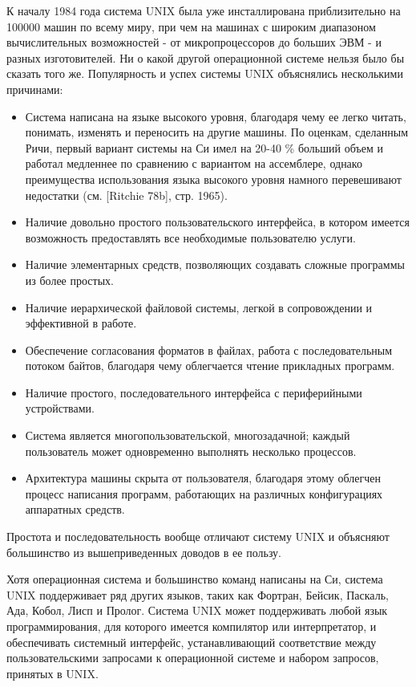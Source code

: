     К началу 1984 года система UNIX была уже  инсталлирована  приблизительно на  100000  машин по всему миру, при чем на машинах с широким диапазоном вычислительных возможностей - от микропроцессоров до больших ЭВМ  -  и  разных изготовителей. Ни о какой другой операционной системе нельзя было бы сказать того  же. Популярность и успех системы UNIX объяснялись несколькими причинами:
\begin{itemize}
\item Система написана на языке высокого уровня, благодаря чему ее легко читать,
  понимать, изменять и переносить на другие машины.  По  оценкам,  сделанным Ричи, первый вариант системы на Си имел на 20-40 \% больший объем и работал медленнее  по сравнению с вариантом на ассемблере, однако преимущества использования языка высокого уровня  намного  перевешивают  недостатки  (см. [Ritchie 78b], стр. 1965).
\item Наличие довольно простого пользовательского интерфейса, в котором имеется возможность предоставлять все необходимые пользователю услуги.
\item Наличие элементарных средств, позволяющих создавать сложные  программы  из более простых.
\item Наличие иерархической файловой системы, легкой в сопровождении и эффективной в работе.
\item Обеспечение согласования форматов в файлах, работа с последовательным потоком байтов, благодаря чему облегчается чтение прикладных программ.
\item Наличие простого, последовательного интерфейса с периферийными устройствами.
\item Система является многопользовательской, многозадачной; каждый пользователь может одновременно выполнять несколько процессов.
\item Архитектура машины скрыта от пользователя, благодаря этому  облегчен  процесс  написания программ, работающих на различных конфигурациях аппаратных средств.
\end{itemize}
    Простота  и  последовательность вообще отличают систему UNIX и объясняют большинство из вышеприведенных доводов в ее пользу.
    
    Хотя операционная система и большинство команд написаны на  Си,  система UNIX  поддерживает  ряд  других  языков, таких как Фортран, Бейсик, Паскаль, Ада, Кобол, Лисп и Пролог. Система UNIX может поддерживать любой язык  программирования, для которого имеется компилятор или интерпретатор, и обеспечивать  системный  интерфейс, устанавливающий соответствие между пользовательскими запросами к операционной системе и набором запросов, принятых в UNIX.
\cite{Bach_Unix}
